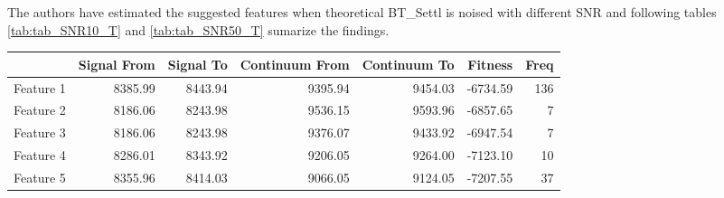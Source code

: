 {{{{The authors have estimated the suggested features when theoretical BT\_Settl 
is noised with different SNR and following tables \ref{tab:tab_SNR10_T} 
and \ref{tab:tab_SNR50_T} sumarize the findings.


\begin{table}
\begin{center}
\begin{tabular}{rrrrrrr}
  \hline
 & Signal From & Signal To & Continuum From & Continuum To & Fitness & Freq \\ 
  \hline
Feature 1 & 8385.99 & 8443.94 & 9395.94 & 9454.03 & -6734.59 & 136 \\ 
  Feature 2 & 8186.06 & 8243.98 & 9536.15 & 9593.96 & -6857.65 &   7 \\ 
  Feature 3 & 8186.06 & 8243.98 & 9376.07 & 9433.92 & -6947.54 &   7 \\ 
  Feature 4 & 8286.01 & 8343.92 & 9206.05 & 9264.00 & -7123.10 &  10 \\ 
  Feature 5 & 8355.96 & 8414.03 & 9066.05 & 9124.05 & -7207.55 &  37 \\ 

\end{tabular}
\end{center}
\end{table}}}}}
